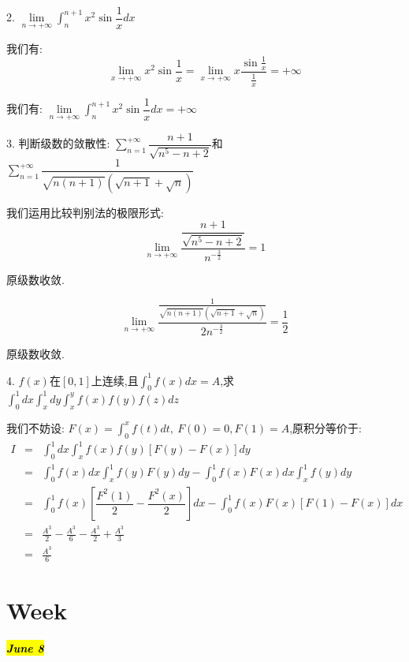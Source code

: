 
2. $\lim\limits_{n\rightarrow +\infty}\int_{n}^{n+1}x^2\sin\dfrac{1}{x}dx$
\begin{solution}
	
	我们有: 
	$$\lim\limits_{x\rightarrow +\infty}x^2\sin\frac{1}{x}=\lim\limits_{x\rightarrow +\infty}x\dfrac{\sin\frac{1}{x}}{\frac{1}{x}}=+\infty$$
	
	我们有: $\lim\limits_{n\rightarrow +\infty}\int_{n}^{n+1}x^2\sin\dfrac{1}{x}dx=+\infty$
\end{solution}


3. 判断级数的敛散性: $\sum\limits_{n=1}^{+\infty}\dfrac{n+1}{\sqrt{n^5-n+2}}$和$\sum\limits_{n=1}^{+\infty}\dfrac{1}{\sqrt{n(n+1)}(\sqrt{n+1}+\sqrt{n})}$
\begin{solution}
	
	我们运用比较判别法的极限形式: 
	$$\lim\limits_{n\rightarrow +\infty}\dfrac{\dfrac{n+1}{\sqrt{n^5-n+2}}}{n^{-\frac{3}{2}}}=1$$
	
	原级数收敛.
	
	$$\lim\limits_{n\rightarrow +\infty}\dfrac{\frac{1}{\sqrt{n(n+1)}(\sqrt{n+1}+\sqrt{n})}}{2n^{-\frac{3}{2}}}=\frac{1}{2}$$
	
	原级数收敛.
\end{solution}


4. $f(x)$在$[0,1]$上连续,且$\int_{0}^{1}f(x)dx=A$,求$\int_{0}^{1}dx\int_{x}^{1}dy\int_{x}^{y}f(x)f(y)f(z)dz$
\begin{solution}
	
	我们不妨设: $F(x)=\int_{0}^{x}f(t)dt,\ F(0)=0,F(1)=A$,原积分等价于: 
	\begin{eqnarray*}
		I&=&\int_{0}^{1}dx\int_{x}^{1}f(x)f(y)[F(y)-F(x)]dy\\
		&=&\int_{0}^{1}f(x)dx\int_{x}^{1}f(y)F(y)dy-\int_{0}^{1}f(x)F(x)dx\int_{x}^{1}f(y)dy\\
		&=&\int_{0}^{1}f(x)[\dfrac{F^2(1)}{2}-\dfrac{F^2(x)}{2}]dx-\int_{0}^{1}f(x)F(x)[F(1)-F(x)]dx\\
		&=&\frac{A^3}{2}-\frac{A^3}{6}-\frac{A^3}{2}+\frac{A^3}{3}\\
		&=&\frac{A^3}{6}
	\end{eqnarray*}
\end{solution}


\section{Week }
\hl{\textbf{\textit{June 8}}}

